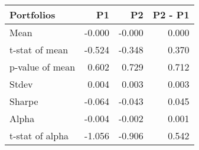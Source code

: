 \begin{tabular}{lrrr}
\toprule
Portfolios & P1 & P2 & P2 - P1 \\
\midrule
Mean & -0.000 & -0.000 & 0.000 \\
t-stat of mean & -0.524 & -0.348 & 0.370 \\
p-value of mean & 0.602 & 0.729 & 0.712 \\
Stdev & 0.004 & 0.003 & 0.003 \\
Sharpe & -0.064 & -0.043 & 0.045 \\
Alpha & -0.004 & -0.002 & 0.001 \\
t-stat of alpha & -1.056 & -0.906 & 0.542 \\
\bottomrule
\end{tabular}
